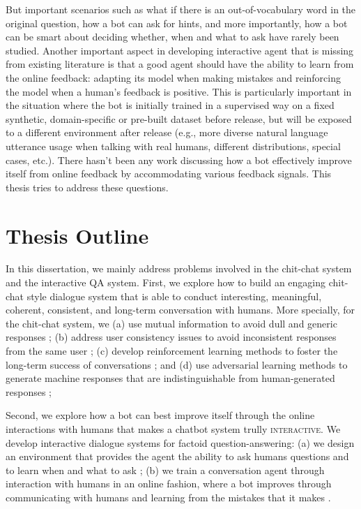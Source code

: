 \noindent But  important scenarios such as what if  there is 
an out-of-vocabulary word in the original question,  how a bot can ask for hints, 
 and more importantly,  how a bot can 
be smart about deciding whether, when and what to ask  have rarely been studied. 
Another important aspect 
in developing interactive agent
that is missing from existing literature is that
a good  agent should have the
ability to learn from the online feedback: adapting its model when making mistakes
and reinforcing the model when a human's feedback is positive. This is particularly important
in the situation where the bot is initially trained in a supervised way on a fixed synthetic, domain-specific
or pre-built dataset before release, but will be exposed to a different environment after
release (e.g., more diverse natural language utterance usage when talking with real humans, different
distributions, special cases, etc.). 
There hasn't been any work discussing how a bot effectively improve itself from online feedback by accommodating various feedback signals.  
This thesis tries to address these questions. 


\section{Thesis Outline}
In this dissertation, we mainly address problems involved in the  
chit-chat system and the interactive QA system. 
First, we explore how to build an engaging chit-chat style dialogue system that is able to conduct 
interesting, meaningful, coherent, consistent, and long-term conversation with humans.  
More specially, 
for the chit-chat system,
we (a) use mutual information to avoid dull and generic responses
\cite{li2015diversity,li2016simple,li2017learning}; (b) address user consistency issues to avoid inconsistent responses from the same user \cite{li2016persona}; (c) develop reinforcement learning 
methods to foster the long-term success of conversations \cite{li2016deep}; and (d) use adversarial learning methods to generate machine responses that are indistinguishable from human-generated responses \cite{li2017adversarial}; 

Second, we explore how a bot can best improve itself through the online interactions with humans that makes a
chatbot system trully \textsc{interactive}. 
We  
develop interactive dialogue  systems for factoid question-answering: 
(a)  we
design an environment that provides the agent the ability to ask humans questions  and to learn when and what to ask \cite{li2016learning};
(b) we train a conversation agent through interaction with humans in an
online fashion, where a bot improves through communicating with humans and learning from the mistakes
that it makes \cite{li2016dialogue}. 

